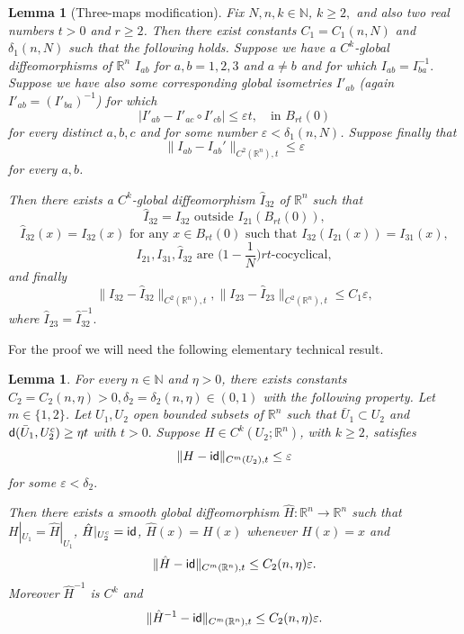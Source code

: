 \documentclass[11pt]{article}
\newcommand{\eps}{\varepsilon}
\newcommand{\rr}{\mathbb{R}}
\newcommand{\sfd}{{\sf d}}
\newcommand{\id}{{\sf id}}
\theoremstyle{plain}
\newtheorem{lemma}[theorem]{Lemma}
\theoremstyle{definition}
\numberwithin{equation}{section}
\begin{document}
\begin{lemma}[Three-maps modification]\label{TML}
	Fix $N,n,k\in \mathbb{N}$, $k\ge 2,$ and also two real numbers $t>0$ and $r\ge 2$. Then there exist constants $C_1=C_1(n,N)$ and $\delta_1(n,N)$ such that the following holds. Suppose we have  a  $C^k$-global  diffeomorphisms of $\rr^n$ $I_{ab}$ for $a,b=1,2,3$ and $a \neq b$ and for which $I_{ab}=I_{ba}^{-1}.$ Suppose we have also some corresponding global isometries $I'_{ab}$ (again $I'_{ab}=(I'_{ba})^{-1}$) for which
	\begin{equation}\label{TML1}
		| I'_{ab}-I'_{ac}\circ  I'_{cb}|\le \eps t, \quad \text{in $B_{rt}(0)$}
	\end{equation}
	for every distinct $a,b,c$ and for some number $\eps <\delta_1(n,N)$.  Suppose finally that
	\begin{equation} \label{TML2}
		\| I_{ab}-I_{ab}'\|_{C^2(\rr^n),t}\le \eps 
	\end{equation}
	for every $a,b$.

	Then there exists a $C^k$-global diffeomorphism $ \hat I_{32}$ of $\rr^n$ such that
	\begin{equation}\label{locality}
		\hat I_{32}=I_{32} \text{ outside } I_{21}(B_{rt}(0)),
	\end{equation} 
	\begin{equation}\label{coherence}
		\hat I_{32}(x)=I_{32}(x) \text{ for any } x \in B_{rt}(0) \text{ such that } I_{32}(I_{21}(x))=I_{31}(x),
	\end{equation}
	\begin{equation}\label{cocycl}
		I_{21},I_{31},\hat I_{32} \text{ are } \big(1-\frac{1}{N}\big )rt\text{-cocyclical},
	\end{equation}
	and finally
	\begin{equation}\label{bound}
		\|I_{32}-\hat I_{32}\|_{C^2(\rr^n),t},\|I_{23}-\hat I_{23}\|_{C^2(\rr^n),t}\le C_1\eps,
	\end{equation} 
	where $\hat I_{23}=\hat I_{32}^{-1}.$
\end{lemma}
For the proof we will need the following elementary technical result.
\begin{lemma}\label{magic}
	For every $n \in \mathbb{N}$ and $\eta >0$, there exists constants $C_2=C_2(n,\eta)>0, \delta_2=\delta_2(n,\eta)\in(0,1)$ with the following property. Let $m \in \{1,2\}$. Let $U_1, U_2$ open bounded subsets of  $\rr^n$ such that $\bar U_1 \subset U_2$ and $\sfd(\bar U_1,U_2^c)\ge \eta t$ with $t>0.$ Suppose $H\in C^k(U_2;\rr^n)$,   with $k \ge 2$, satisfies  
	$$\|H-{\sf{id}}\|_{C^m(U_2),t}\le  \eps$$
	for some $\eps < \delta_2.$
	
	Then there exists a smooth  global diffeomorphism $\hat H : \rr^n \to \rr^n$ such that $H|_{U_1}=\hat H|_{U_1}$, $\hat H|_{U_2^c}=\id$, $\hat H(x)=H(x)$ whenever $H(x)=x$ and
	\begin{equation}\label{H}
		\|\hat H-{\sf{id}}\|_{C^m(\rr^n),t}\le  C_2(n,\eta)\eps.
	\end{equation}
	Moreover $\hat H^{-1}$ is $C^k$ and 
	\begin{equation}\label{invH}
		\|\hat H^{-1}-{\sf{id}}\|_{C^m(\rr^n),t}\le  C_2(n,\eta)\eps.
	\end{equation}
\end{lemma}		
\end{document}
